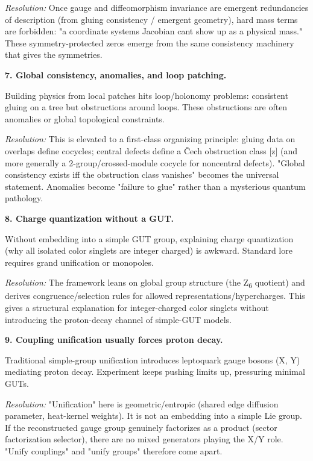 \emph{Resolution:} Once gauge and diffeomorphism invariance are emergent redundancies of description (from gluing consistency / emergent geometry), hard mass terms are forbidden: "a coordinate system\textquotesingle s Jacobian can\textquotesingle t show up as a physical mass." These symmetry-protected zeros emerge from the same consistency machinery that gives the symmetries.

\textbf{7. Global consistency, anomalies, and loop patching.}

Building physics from local patches hits loop/holonomy problems: consistent gluing on a tree but obstructions around loops. These obstructions are often anomalies or global topological constraints.

\emph{Resolution:} This is elevated to a first-class organizing principle: gluing data on overlaps define cocycles; central defects define a \v{C}ech obstruction class {[}z{]} (and more generally a 2-group/crossed-module cocycle for noncentral defects). "Global consistency exists iff the obstruction class vanishes" becomes the universal statement. Anomalies become "failure to glue" rather than a mysterious quantum pathology.

\textbf{8. Charge quantization without a GUT.}

Without embedding into a simple GUT group, explaining charge quantization (why all isolated color singlets are integer charged) is awkward. Standard lore requires grand unification or monopoles.

\emph{Resolution:} The framework leans on global group structure (the Z\textsubscript{6} quotient) and derives congruence/selection rules for allowed representations/hypercharges. This gives a structural explanation for integer-charged color singlets without introducing the proton-decay channel of simple-GUT models.

\textbf{9. Coupling unification usually forces proton decay.}

Traditional simple-group unification introduces leptoquark gauge bosons (X, Y) mediating proton decay. Experiment keeps pushing limits up, pressuring minimal GUTs.

\emph{Resolution:} "Unification" here is geometric/entropic (shared edge diffusion parameter, heat-kernel weights). It is not an embedding into a simple Lie group. If the reconstructed gauge group genuinely factorizes as a product (sector factorization selector), there are no mixed generators playing the X/Y role. "Unify couplings" and "unify groups" therefore come apart.

